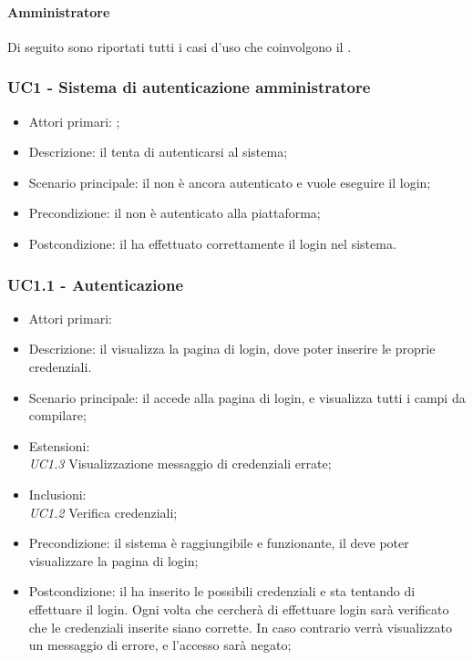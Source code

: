 \documentclass[../analisi-dei-requisiti]{subfiles}
\begin{document}
\paragraph{Amministratore}
\label{par:amministratore}
Di seguito sono riportati tutti i casi d'uso che coinvolgono il  .


\subsubsection{UC1 - Sistema di autenticazione amministratore}
\label{subsub:UC1}

\begin{itemize}
\item Attori primari: ;
\item Descrizione: il  tenta di autenticarsi al sistema;
\item Scenario principale: il  non è ancora autenticato e vuole eseguire il login;
\item Precondizione: il  non è autenticato alla piattaforma;
\item Postcondizione: il  ha effettuato correttamente il login nel sistema.

\end{itemize}
\subsubsection{UC1.1 - Autenticazione}
\label{subsub:UC1.1}

\begin{itemize}
\item Attori primari: 
\item Descrizione: il  visualizza la pagina di login, dove poter inserire le proprie credenziali. 
\item Scenario principale: il  accede alla pagina di login, e visualizza tutti i campi da compilare;
\item Estensioni: \\\emph{UC1.3} Visualizzazione messaggio di credenziali errate;
\item Inclusioni: \\\emph{UC1.2} Verifica credenziali;
\item Precondizione: il sistema è raggiungibile e funzionante, il  deve poter visualizzare la pagina di login;
\item Postcondizione: il  ha inserito le possibili credenziali e sta tentando di effettuare il login. Ogni volta che cercherà di effettuare
login sarà verificato che le credenziali inserite siano corrette. In caso contrario verrà visualizzato un messaggio di errore, e l'accesso sarà negato;

\end{itemize}
\end{document}
